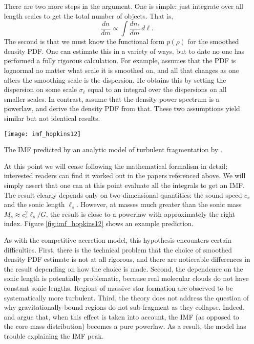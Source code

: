 There are two more steps in the argument. One is simple: just integrate over all length scales to get the total number of objects. That is,
\begin{equation}
\frac{dn}{dm} \propto \int \frac{dn_\ell}{dm} \, d\ell.
\end{equation}
The second is that we must know the functional form $p(\rho)$ for the smoothed density PDF. One can estimate this in a variety of ways, but to date no one has performed a fully rigorous calculation. For example, \citet{hopkins12e} assumes that the PDF is lognormal no matter what scale it is smoothed on, and all that changes as one alters the smoothing scale is the dispersion. He obtains this by setting the dispersion on some scale $\sigma_\ell$ equal to an integral over the dispersions on all smaller scales. In contrast, \citet{hennebelle08b, hennebelle09a} assume that the density power spectrum is a powerlaw, and derive the density PDF from that. These two assumptions yield similar but not identical results.

\begin{marginfigure}
\texttt{[image: imf\_hopkins12]}
\caption[IMF from an analytic model of turbulent fragmentation]{
\label{fig:imf_hopkins12}
The IMF predicted by an analytic model of turbulent fragmentation by \citet{hopkins12d}.
}
\end{marginfigure}
At this point we will cease following the mathematical formalism in detail; interested readers can find it worked out in the papers referenced above. We will simply assert that one can at this point evaluate all the integrals to get an IMF. The result clearly depends only on two dimensional quantities: the sound speed $c_s$ and the sonic length $\ell_s$. However, at masses much greater than the sonic mass $M_s \approx c_s^2 \ell_s/G$, the result is close to a powerlaw with approximately the right index. Figure \ref{fig:imf_hopkins12} shows an example prediction.

As with the competitive accretion model, this hypothesis encounters certain difficulties. First, there is the technical problem that the choice of smoothed density PDF estimate is not at all rigorous, and there are noticeable differences in the result depending on how the choice is made. Second, the dependence on the sonic length is potentially problematic, because real molecular clouds do not have constant sonic lengths. Regions of massive star formation are observed to be systematically more turbulent. Third, the theory does not address the question of why gravitationally-bound regions do not sub-fragment as they collapse. Indeed, \citet{guszejnov15a} and \citet{guszejnov16a} argue that, when this effect is taken into account, the IMF (as opposed to the core mass distribution) becomes a pure powerlaw. As a result, the model has trouble explaining the IMF peak.

